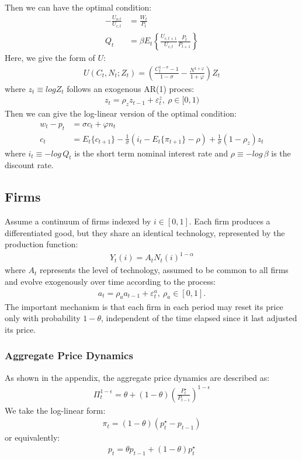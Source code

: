 \documentclass{article}
\numberwithin{equation}{section}
\begin{document}
Then we can have the optimal condition:
	\begin{align*}
		-\frac{U_{n.t}}{U_{c,t}} &= \frac{W_t}{P_t}\\
		Q_t &= \beta E_t\left\{\frac{U_{c,t+1}}{U_{c,t}} \frac{P_t}{P_{t+1}}\right\}
	\end{align*}
Here, we give the form of $U$:
	\begin{align*}
		U(C_t, N_t; Z_t) = \left(\frac{C^{1-\sigma}_t - 1}{1 - \sigma} - \frac{N^{1 + \varphi}}{1 + \varphi}\right) Z_t
	\end{align*}
where $z_t \equiv log Z_t$ follows an exogenous AR(1) proces:
	\begin{align*}
		z_t = \rho_z z_{t-1} + \varepsilon^z_t,\ \rho \in [0, 1)
	\end{align*}
Then we can give the log-linear version of the optimal condition:
	\begin{align}
		w_t - p_t &= \sigma c_t + \varphi n_t \label{1.1-1}\\
		c_t &= E_t\{c_{t+1}\} - \frac{1}{\sigma}(i_t - E_t\{\pi_{t+1}\} - \rho) + \frac{1}{\sigma}(1 - \rho_z)z_t \label{1.1-2}
	\end{align}
where $i_t \equiv -log\,Q_t$ is the short term nominal interest rate and $\rho \equiv -log\,\beta$ is the discount rate.


\subsection{Firms}
Assume a continuum of firms indexed by $i \in [0, 1]$. Each firm produces a differentiated good, but they share an identical technology, represented by the production function:
	\begin{align*}
		Y_t(i) = A_tN_t(i)^{1-\alpha}
	\end{align*}
where $A_t$ represents the level of technology, assumed to be common to all firms and evolve exogenously over time according to the process:
	\begin{align*}
		a_t = \rho_a a_{t-1} + \varepsilon^a_t,\ \rho_a \in [0, 1].
	\end{align*} 
The important mechanism is that each firm in each period may reset its price only with probability $1 - \theta$, independent of the time elapsed since it last adjusted its price.

\subsubsection{Aggregate Price Dynamics}
As shown in the appendix, the aggregate price dynamics are described as:
	\begin{align*}
		\Pi^{1-\epsilon}_t = \theta + (1 - \theta)\left(\frac{P^\star_t}{P_{t-1}}\right)^{1-\epsilon}
	\end{align*}
We take the log-linear form:
	\begin{align}
		\pi_t = (1 - \theta)(p^\star_t - p_{t-1}) \label{1.2.1-1}
	\end{align}
or equivalently:
	\begin{align*}
		p_t = \theta p_{t-1} + (1 - \theta)p^\star_t
	\end{align*}
\end{document}
